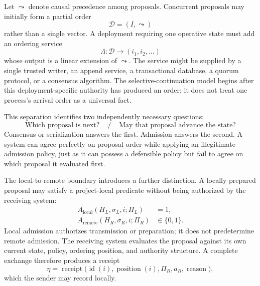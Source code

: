 \documentclass[11pt]{article}
\begin{document}
Let $\leadsto$ denote causal precedence among proposals. Concurrent proposals may initially form a partial order
\begin{equation}
  \mathcal{D}=(I,\leadsto)
  \label{eq:proposal-dag}
\end{equation}
rather than a single vector. A deployment requiring one operative state must add an ordering service
\begin{equation}
  \Lambda:\mathcal{D}\to(i_1,i_2,\ldots)
  \label{eq:linearization}
\end{equation}
whose output is a linear extension of $\leadsto$. The service might be supplied by a single trusted writer, an append service, a transactional database, a quorum protocol, or a consensus algorithm. The selective-continuation model begins after this deployment-specific authority has produced an order; it does not treat one process's arrival order as a universal fact.

This separation identifies two independently necessary questions:
\begin{equation}
  \boxed{\text{Which proposal is next?}\quad\neq\quad
  \text{May that proposal advance the state?}}
  \label{eq:order-vs-admission}
\end{equation}
Consensus or serialization answers the first. Admission answers the second. A system can agree perfectly on proposal order while applying an illegitimate admission policy, just as it can possess a defensible policy but fail to agree on which proposal it evaluated first.

The local-to-remote boundary introduces a further distinction. A locally prepared proposal may satisfy a project-local predicate without being authorized by the receiving system:
\begin{align}
  A_{\mathrm{local}}(H_L,\sigma_L,i;\Pi_L)&=1,\\
  A_{\mathrm{remote}}(H_R,\sigma_R,i;\Pi_R)&\in\{0,1\}.
\end{align}
Local admission authorizes transmission or preparation; it does not predetermine remote admission. The receiving system evaluates the proposal against its own current state, policy, ordering position, and authority structure. A complete exchange therefore produces a receipt
\begin{equation}
  \eta=\operatorname{receipt}\bigl(
  \operatorname{id}(i),\operatorname{position}(i),
  \Pi_R,a_R,\operatorname{reason}\bigr),
  \label{eq:remote-receipt}
\end{equation}
which the sender may record locally.
\end{document}
